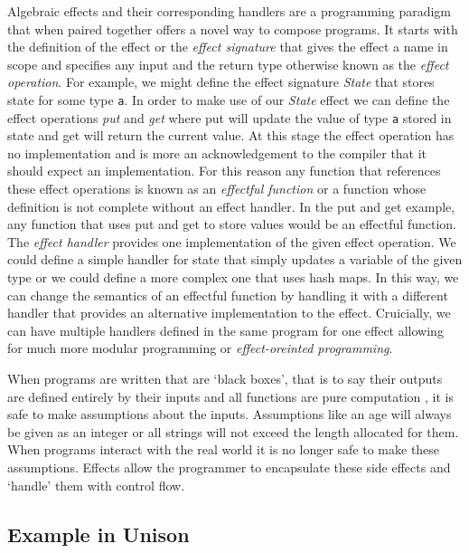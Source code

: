 \documentclass[logo,bsc,singlespacing,parskip]{infthesis}
\begin{document}
Algebraic effects \cite{plotkin2002computational} and their corresponding
handlers \cite{plotkin2009handlers} \cite{pretnar2015introduction} are a
programming paradigm that when paired together offers a novel way to compose
programs. It starts with the definition of the effect or the \emph{effect
signature} that gives the effect a name in scope and specifies any input and the
return type otherwise known as the \emph{effect operation}.  For example, we
might define the effect signature \emph{State} that stores state for some type
\texttt{a}. In order to make use of our \emph{State} effect we can define the
effect operations \emph{put} and \emph{get} where put will update the value of
type \texttt{a} stored in state and get will return the current value.  At this
stage the effect operation has no implementation and is more an acknowledgement
to the compiler that it should expect an implementation. For this reason any
function that references these effect operations is known as an \emph{effectful
function} or a function whose definition is not complete without an effect
handler. In the put and get example, any function that uses put and get to store
values would be an effectful function. The \emph{effect handler} provides one
implementation of the given effect operation. We could define a simple handler
for state that simply updates a variable of the given type or we could define a
more complex one that uses hash maps.  In this way, we can change the semantics
of an effectful function by handling it with a different handler that provides
an alternative implementation to the effect. Cruicially, we can have multiple
handlers defined in the same program for one effect allowing for much more
modular programming or \emph{effect-oreinted programming}.

When programs are written that are `black boxes', that is to say their outputs
are defined entirely by their inputs and all functions are pure computation
\cite{hughes1989functional}, it is safe to make assumptions about the inputs.
Assumptions like an age will always be given as an integer or all strings will
not exceed the length allocated for them. When programs interact with the real
world it is no longer safe to make these assumptions. Effects allow the
programmer to encapsulate these side effects and `handle' them with control
flow.

\subsection{Example in Unison}
\label{subsection:unison}
\end{document}

